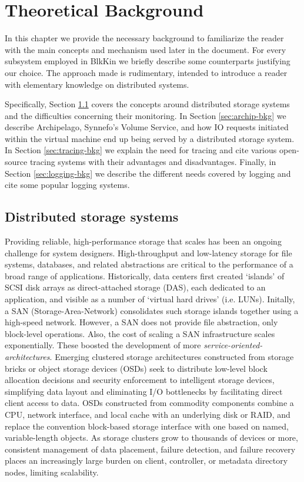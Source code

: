 \chapter{Theoretical Background}\label{ch:bkg}

In this chapter we provide the necessary background to familiarize the reader
with the main concepts and mechanism used later in the document. For every
subsystem employed in BlkKin we briefly describe some counterparts justifying
our choice. The approach made is rudimentary, intended to introduce a reader
with elementary knowledge on distributed systems.

Specifically, Section \ref{sec:storage} covers the concepts around distributed
storage systems and the difficulties concerning their monitoring.  In Section
\ref{sec:archip-bkg} we describe Archipelago, Synnefo's Volume Service, and how
IO requests initiated within the virtual machine end up being served by a
distributed storage system. In Section \ref{sec:tracing-bkg} we explain the need
for tracing and cite various open-source tracing systems  with their advantages
and disadvantages. Finally, in Section \ref{sec:logging-bkg} we describe the
different needs covered by logging and cite some popular logging systems.


\section{Distributed storage systems}\label{sec:storage}

Providing reliable, high-performance storage that scales has been an ongoing
challenge for system designers. High-throughput and low-latency storage for file
systems, databases, and related abstractions are critical to the performance of
a broad range of applications. Historically, data centers first created
`islands' of SCSI disk arrays as direct-attached storage (DAS), each dedicated
to an application, and visible as a number of `virtual hard drives' (i.e.
LUNs). Initally, a SAN (Storage-Area-Network) consolidates such storage islands
together using a high-speed network. However, a SAN does not provide file
abstraction, only block-level operations. Also, the cost of scaling a SAN
infrastructure scales exponentially. These boosted the development of more
\emph{service-oriented-architectures}. Emerging clustered storage architectures
constructed from storage bricks or object storage devices (OSDs) seek to
distribute low-level block allocation decisions and security enforcement to
intelligent storage devices, simplifying data layout and eliminating I/O
bottlenecks by facilitating direct client access to data. OSDs constructed from
commodity components combine a CPU, network interface, and local cache with an
underlying disk or RAID, and replace the convention block-based storage
interface with one based on named, variable-length objects. As storage clusters
grow to thousands of devices or more, consistent management of data placement,
failure detection, and failure recovery places an increasingly large burden on
client, controller, or metadata directory nodes, limiting scalability.

